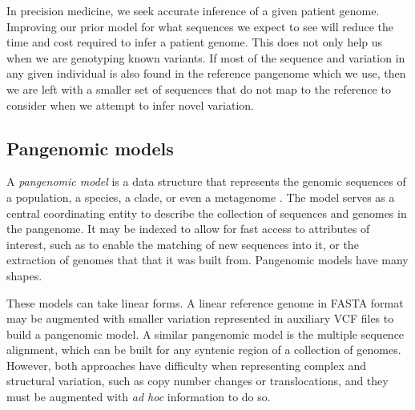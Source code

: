 

In precision medicine, we seek accurate inference of a given patient genome.
Improving our prior model for what sequences we expect to see will reduce the time and cost required to infer a patient genome.
This does not only help us when we are genotyping known variants.
If most of the sequence and variation in any given individual is also found in the reference pangenome which we use, then we are left with a smaller set of sequences that do not map to the reference to consider when we attempt to infer novel variation.

\subsection{Pangenomic models}

A \emph{pangenomic model} is a data structure that represents the genomic sequences of a population, a species, a clade, or even a metagenome \cite{computational2016computational}.
The model serves as a central coordinating entity to describe the collection of sequences and genomes in the pangenome.
It may be indexed to allow for fast access to attributes of interest, such as to enable the matching of new sequences into it, or the extraction of genomes that that it was built from.
Pangenomic models have many shapes.

These models can take linear forms.
A linear reference genome in FASTA format may be augmented with smaller variation represented in auxiliary VCF files to build a pangenomic model.
A similar pangenomic model is the multiple sequence alignment, which can be built for any syntenic region of a collection of genomes.
However, both approaches have difficulty when representing complex and structural variation, such as copy number changes or translocations, and they must be augmented with \textit{ad hoc} information to do so.

